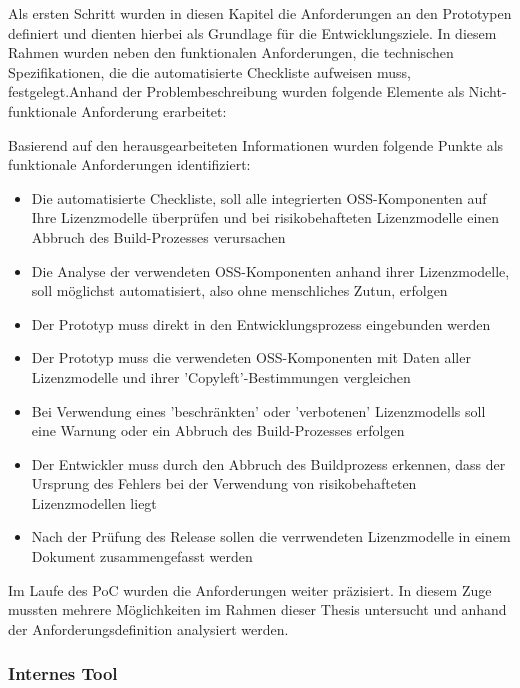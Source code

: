 Als ersten Schritt wurden in diesen Kapitel die Anforderungen an den Prototypen definiert und dienten hierbei als Grundlage für die Entwicklungsziele. In diesem Rahmen wurden neben den funktionalen Anforderungen, die technischen Spezifikationen, die die automatisierte Checkliste aufweisen muss, festgelegt.Anhand der Problembeschreibung wurden folgende Elemente als Nicht-funktionale Anforderung erarbeitet: 

Basierend auf den herausgearbeiteten Informationen wurden folgende Punkte als funktionale Anforderungen identifiziert: 

\begin{itemize}
    \item Die automatisierte Checkliste, soll alle integrierten OSS-Komponenten auf Ihre Lizenzmodelle überprüfen und bei risikobehafteten Lizenzmodelle einen Abbruch des Build-Prozesses verursachen
    \item Die Analyse der verwendeten OSS-Komponenten anhand ihrer Lizenzmodelle, soll möglichst automatisiert, also ohne menschliches Zutun, erfolgen
    \item Der Prototyp muss direkt in den Entwicklungsprozess  eingebunden werden 
    \item Der Prototyp muss die verwendeten OSS-Komponenten mit Daten aller Lizenzmodelle und ihrer 'Copyleft'-Bestimmungen vergleichen 
    \item Bei Verwendung eines 'beschränkten' oder 'verbotenen' Lizenzmodells soll eine Warnung oder ein Abbruch des Build-Prozesses erfolgen      
    \item Der Entwickler muss durch den Abbruch des Buildprozess erkennen, dass der Ursprung des Fehlers bei der Verwendung von risikobehafteten Lizenzmodellen liegt
    \item Nach der Prüfung des Release sollen die verrwendeten Lizenzmodelle in einem Dokument zusammengefasst werden
\end{itemize}

Im Laufe des PoC wurden die Anforderungen weiter präzisiert. In diesem Zuge mussten mehrere Möglichkeiten im Rahmen dieser Thesis untersucht und anhand der Anforderungsdefinition analysiert werden.

\subsubsection{Internes Tool}

